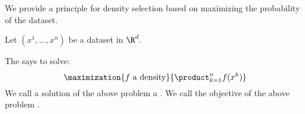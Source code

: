 

We provide a principle for density
selection based on maximizing the
probability of the dataset.


Let $(x^1, \dots, x^n)$ be a dataset
in $\R^d$.

The 
says to solve:
\[
  \maximization{f \text{ a density}}{\product_{k = 1}^{n} f(x^k)}
\]
We call a solution of the
above problem a
.
We call the objective of the
above problem
.

